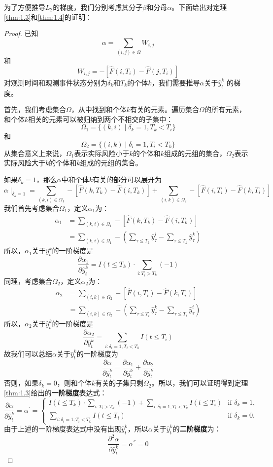 为了方便推导$L_2$的梯度，我们分别考虑其分子$\beta$和分母$\alpha$。下面给出对定理\ref{thm:1.3}和\ref{thm:1.4}的证明：
\begin{proof}
已知$$\alpha = \sum_{(i,j)\in \Omega} W_{i,j}$$ 和 $$W_{i,j} = -\left[ \hat{F}(i, T_i) - \hat{F}(j, T_i) \right]$$ 对观测时间和观测事件状态分别为$\delta_k$和$T_k$的个体$k$，我们需要推导$\alpha$关于$\hat{y}_t^k$ 的梯度。

首先，我们考虑集合$\Omega$，从中找到和个体$k$有关的元素。遍历集合$\Omega$的所有元素，和个体$k$相关的元素可以被归纳到两个不相交的子集中：$$\Omega_1=\{(k,i) \mid \delta_k=1,T_k < T_i\}$$ 和 $$\Omega_2=\{(i,k) \mid \delta_i=1,T_i < T_k\}$$ 从集合意义上来说，$\Omega_1$表示实际风险小于$k$的个体和$k$组成的元组的集合，$\Omega_2$表示实际风险大于$k$的个体和$k$组成的元组的集合。

如果$\delta_k = 1$，那么$\alpha$中和个体$k$有关的部分可以展开为$$\alpha \mid_{\delta_k=1}=\sum_{(k,i)\in \Omega_1} -\left[ \hat{F}(k, T_k) - \hat{F}(i, T_k) \right] + \sum_{(i,k)\in \Omega_2} -\left[ \hat{F}(i, T_i) - \hat{F}(k, T_i) \right] $$ 我们首先考虑集合$\Omega_1$，定义$\alpha_1$为：\[
\begin{split}
\alpha_1 &= \sum_{(k,i)\in \Omega_1} -\left[ \hat{F}(k, T_k) - \hat{F}(i, T_k) \right] \\
         &= \sum_{(k,i)\in \Omega_1} - ( \sum_{\tau \le T_k} \hat{y}_{\tau}^i - \sum_{\tau \le T_k} \hat{y}_{\tau}^k )
\end{split}
\] 所以，$\alpha_1$关于$\hat{y}_t^k$的一阶梯度是$$\frac{\partial \alpha_1}{\partial \hat{y}_t^k} = I(t\le T_k)\cdot {\sum\limits_{i: T_i>T_k}(-1)}$$ 同理，考虑集合$\Omega_2$，定义$\alpha_2$为：\[
\begin{split}
\alpha_2 &= \sum_{(i,k)\in \Omega_2} -\left[ \hat{F}(i, T_i) - \hat{F}(k, T_i) \right] \\
         &= \sum_{(i,k)\in \Omega_2} - ( \sum_{\tau \le T_i} \hat{y}_{\tau}^k - \sum_{\tau \le T_i} \hat{y}_{\tau}^i )
\end{split}
\] 所以，$\alpha_2$关于$\hat{y}_t^k$的一阶梯度是$$\frac{\partial \alpha_2}{\partial \hat{y}_t^k} = \sum\limits_{i: \delta_i=1,T_i<T_k} I(t\le T_i)$$ 故我们可以总结$\alpha$关于$\hat{y}_t^k$的一阶梯度为$$\frac{\partial \alpha}{\partial \hat{y}_t^k} = \frac{\partial \alpha_1}{\partial \hat{y}_t^k} + \frac{\partial \alpha_2}{\partial \hat{y}_t^k}$$ 否则，如果$\delta_k = 0$，则和个体$k$有关的子集只剩$\Omega_2$。所以，我们可以证明得到定理\ref{thm:1.3}给出的\textbf{一阶梯度}表达式：$$
\frac{\partial \alpha}{\partial \hat{y}_t^k}=\alpha^{'}=
\begin{cases}
I(t\le T_k)\cdot {\sum\limits_{i: T_i>T_k}(-1)} + \sum\limits_{i: \delta_i=1,T_i<T_k} I(t\le T_i) & \text{if } \delta_k = 1,\\
\sum\limits_{i: \delta_i=1,T_i<T_k} I(t\le T_i) & \text{if } \delta_k = 0.
\end{cases}
$$ 由于上述的一阶梯度表达式中没有出现$\hat{y}_t^k$，所以$\alpha$关于$\hat{y}_t^k$的\textbf{二阶梯度}为：$$
\frac{\partial^2 \alpha}{\partial \hat{y}_t^k}=\alpha^{''}=0
$$


\end{proof}
